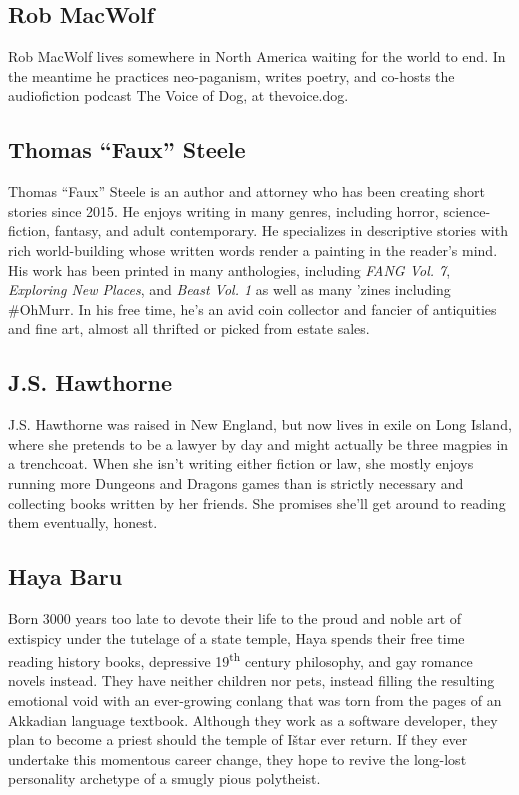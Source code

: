 \subsection*{Rob MacWolf}
Rob MacWolf lives somewhere in North America waiting for the world to end. In the meantime he practices neo-paganism, writes poetry, and co-hosts the audiofiction podcast The Voice of Dog, at thevoice.dog.

\subsection*{Thomas ``Faux'' Steele}
Thomas ``Faux'' Steele is an author and attorney who has been creating short stories since 2015. He enjoys writing in many genres, including horror, science-fiction, fantasy, and adult contemporary. He specializes in descriptive stories with rich world-building whose written words render a painting in the reader's mind. His work has been printed in many anthologies, including \emph{FANG Vol. 7}, \emph{Exploring New Places}, and \emph{Beast Vol. 1} as well as many 'zines including \#OhMurr. In his free time, he's an avid coin collector and fancier of antiquities and fine art, almost all thrifted or picked from estate sales.

\subsection*{J.S. Hawthorne}
J.S. Hawthorne was raised in New England, but now lives in exile on Long Island, where she pretends to be a lawyer by day and might actually be three magpies in a trenchcoat. When she isn't writing either fiction or law, she mostly enjoys running more Dungeons and Dragons games than is strictly necessary and collecting books written by her friends. She promises she'll get around to reading them eventually, honest.

\subsection*{Haya Baru}
Born 3000 years too late to devote their life to the proud and noble art of extispicy under the tutelage of a state temple, Haya spends their free time reading history books, depressive 19\textsuperscript{th} century philosophy, and gay romance novels instead. They have neither children nor pets, instead filling the resulting emotional void with an ever-growing conlang that was torn from the pages of an Akkadian language textbook. Although they work as a software developer, they plan to become a priest should the temple of Ištar ever return. If they ever undertake this momentous career change, they hope to revive the long-lost personality archetype of a smugly pious polytheist.

